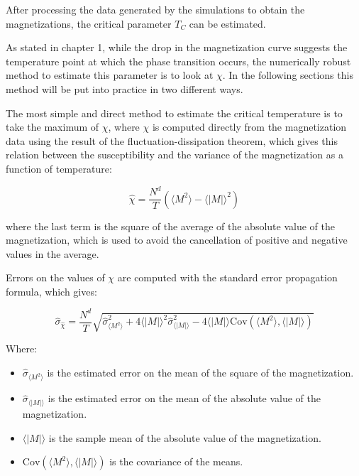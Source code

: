 After processing the data generated by the simulations to obtain the magnetizations, the critical parameter $T_C$ can be estimated.

As stated in chapter 1, while the drop in the magnetization curve suggests the temperature point at which the phase transition occurs, the numerically robust method to estimate this parameter is to look at $\chi$. In the following sections this method will be put into practice in two different ways.

The most simple and direct method to estimate the critical temperature is to take the maximum of $\chi$, where $\chi$ is computed directly from the magnetization data using the result of the fluctuation-dissipation theorem, which gives this relation between the susceptibility and the variance of the magnetization as a function of temperature:

\begin{equation}
	\hat{\chi} = \frac{N^d}{T} \left( \langle M^2 \rangle - \langle |M| \rangle^2 \right)
\end{equation}

where the last term is the square of the average of the absolute value of the magnetization, which is used to avoid the cancellation of positive and negative values in the average.

Errors on the values of $\chi$ are computed with the standard error propagation formula, which gives:

\begin{equation}
	\hat{\sigma}_{\hat{\chi}} = \frac{N^d}{T} \sqrt{ \hat{\sigma}_{\langle M^2 \rangle}^2 + 4 \langle \vert{}M\vert{} \rangle^2 \hat{\sigma}_{\langle \vert{}M\vert{} \rangle}^2 - 4 \langle \vert{}M\vert{} \rangle \text{Cov}(\langle M^2 \rangle, \langle \vert{}M\vert{} \rangle) }
\end{equation}

Where:

\begin{itemize}
	\item $\hat{\sigma}_{\langle M^2 \rangle}$ is the estimated error on the mean of the square of the magnetization.
	\item $\hat{\sigma}_{\langle \vert{}M\vert{} \rangle}$ is the estimated error on the mean of the absolute value of the magnetization.
	\item $\langle \vert{}M\vert{} \rangle$ is the sample mean of the absolute value of the magnetization.
	\item $\text{Cov}(\langle M^2 \rangle, \langle \vert{}M\vert{} \rangle)$ is the covariance of the means.
\end{itemize}

